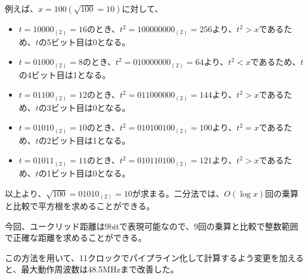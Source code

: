 例えば、$x=100 (\sqrt{100}=10)$に対して、
\begin{itemize}
    \item $t=10000_{(2)}=16$のとき、$t^2=100000000_{(2)}=256$より、$t^2>x$であるため、$t$の5ビット目は0となる。
    \item $t=01000_{(2)}=8$のとき、$t^2=010000000_{(2)}=64$より、$t^2<x$であるため、$t$の4ビット目は1となる。
    \item $t=01100_{(2)}=12$のとき、$t^2=011000000_{(2)}=144$より、$t^2>x$であるため、$t$の3ビット目は0となる。
    \item $t=01010_{(2)}=10$のとき、$t^2=010100100_{(2)}=100$より、$t^2=x$であるため、$t$の2ビット目は1となる。
    \item $t=01011_{(2)}=11$のとき、$t^2=010110100_{(2)}=121$より、$t^2>x$であるため、$t$の1ビット目は0となる。
\end{itemize}
以上より、$\sqrt{100}=01010_{(2)}=10$が求まる。二分法では、$O(\log x)$回の乗算と比較で平方根を求めることができる。

今回、ユークリッド距離は9bitで表現可能なので、9回の乗算と比較で整数範囲で正確な距離を求めることができる。

この方法を用いて、11クロックでパイプライン化して計算するよう変更を加えると、最大動作周波数は48.5MHzまで改善した。



